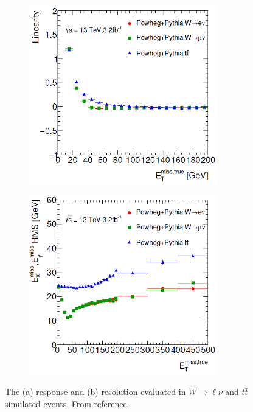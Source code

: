 \begin{figure}[h!]
\begin{subfigure}{0.5\textwidth}
  \centering
  \includegraphics[width=0.9\textwidth]{figures/Objects/metresponse.png}
  \caption{}
  \label{fig:obj:met:resolution}
\end{subfigure}
\begin{subfigure}{0.5\textwidth}
  \centering
  \includegraphics[width=0.9\textwidth]{figures/Objects/metresolution.png}
  \caption{}
  \label{fig:obj:met:response}
\end{subfigure}
\captionsetup{width=0.85\textwidth} \caption{\small The \MET (a) response and (b) resolution evaluated in $W\to \ell \nu$ and $t\bar{t}$ simulated events. From reference \cite{ATL-PHYS-PUB-2015-023}.}
\label{fig:obj:met:resoresp}
\end{figure}


